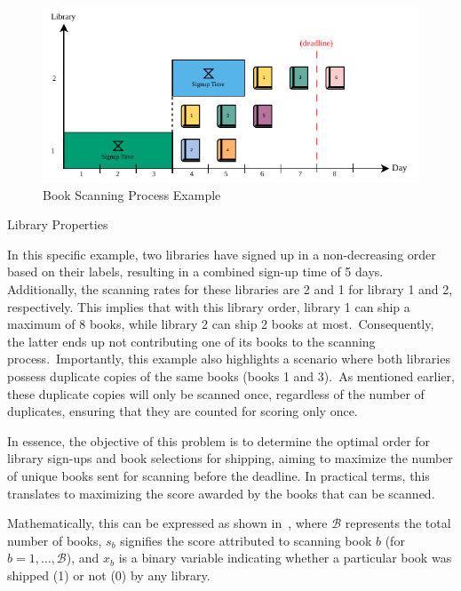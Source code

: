 \begin{figure}[h]
  \centering
  \includegraphics[width=\textwidth,keepaspectratio]{../assets/bs/bs-example.pdf}
  \caption{Book Scanning Process Example}
  \label{fig:bs-example}
\end{figure}

\begin{table}[ht]
  \centering
  
  \caption{Library Properties}
  \label{tab:bs-library-properties}
\end{table}

In this specific example, two libraries have signed up in a non-decreasing order
based on their labels, resulting in a combined sign-up time of 5 days.
Additionally, the scanning rates for these libraries are 2 and 1 for library 1
and 2, respectively. This implies that with this library order, library 1 can
ship a maximum of 8 books, while library 2 can ship 2 books at
most.~Consequently, the latter ends up not contributing one of its books to the
scanning process.~Importantly, this example also highlights a scenario where
both libraries possess duplicate copies of the same books (books 1 and 3).~As
mentioned earlier, these duplicate copies will only be scanned once, regardless
of the number of duplicates, ensuring that they are counted for scoring only
once.

In essence, the objective of this problem is to determine the optimal order for
library sign-ups and book selections for shipping, aiming to maximize the number
of unique books sent for scanning before the deadline. In practical terms, this
translates to maximizing the score awarded by the books that can be scanned.

Mathematically, this can be expressed as shown in~,
where $\mathcal{B}$ represents the total number of books, $s_{b}$ signifies the
score attributed to scanning book $b$ (for $b = 1, \ldots, \mathcal{B}$), and
$x_{b}$ is a binary variable indicating whether a particular book was shipped
(1) or not (0) by any library.

